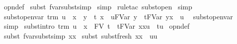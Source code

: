 \begin{isabellebody}
%
\isadelimproof
%
\endisadelimproof
%
\isatagproof
{}\isamarkupfalse%
\ opn{\isacharprime}{\isacharunderscore}def\isanewline
{}\isamarkupfalse%
\ {\isacharparenleft}subst{\isacharparenleft}{}{\isacharparenright}\ fvar{\isacharunderscore}subst{\isacharunderscore}simp{\isacharparenright}\isanewline
{}\isamarkupfalse%
\ simp\isanewline
{}\isamarkupfalse%
\ {\isacharparenleft}rule{\isacharunderscore}tac\ subst{\isacharunderscore}open{\isacharparenright}\isanewline
{}\isamarkupfalse%
\ simp%
\endisatagproof
{\isafoldproof}%
%
\isadelimproof
\isanewline
%
\endisadelimproof
\isanewline
{}\isamarkupfalse%
\ subst{\isacharunderscore}open{\isacharunderscore}var{}{\isacharcolon}\ {\isachardoublequoteopen}trm\ u\ {\isasymLongrightarrow}\ x\ {\isasymnoteq}\ y\ {\isasymLongrightarrow}\ {\isacharparenleft}t\ {\isacharbrackleft}x\ {\isacharcolon}{\isacharcolon}{\isacharequal}\ u{\isacharbrackright}{\isacharparenright}{\isacharcircum}FVar\ y\ {\isacharequal}\ {\isacharparenleft}t{\isacharcircum}FVar\ y{\isacharparenright}{\isacharbrackleft}x\ {\isacharcolon}{\isacharcolon}{\isacharequal}\ u{\isacharbrackright}{\isachardoublequoteclose}\ \isanewline
%
\isadelimproof
%
\endisadelimproof
%
\isatagproof
{}\isamarkupfalse%
\ subst{\isacharunderscore}open{\isacharunderscore}var\ \isamarkupfalse%
\ simp%
\endisatagproof
{\isafoldproof}%
%
\isadelimproof
\isanewline
%
\endisadelimproof
\isanewline
{}\isamarkupfalse%
\ subst{\isacharunderscore}intro{\isacharcolon}\ {\isachardoublequoteopen}trm\ u\ {\isasymLongrightarrow}\ x\ {\isasymnotin}\ FV\ t\ {\isasymLongrightarrow}\ {\isacharparenleft}t{\isacharcircum}FVar\ x{\isacharparenright}{\isacharbrackleft}x{\isacharcolon}{\isacharcolon}{\isacharequal}u{\isacharbrackright}\ {\isacharequal}\ t{\isacharcircum}u{\isachardoublequoteclose}\isanewline
%
\isadelimproof
%
\endisadelimproof
%
\isatagproof
{}\isamarkupfalse%
\ opn{\isacharprime}{\isacharunderscore}def\isanewline
{}\isamarkupfalse%
\ {\isacharparenleft}subst{\isacharparenleft}{}{\isacharparenright}\ fvar{\isacharunderscore}subst{\isacharunderscore}simp{}{\isacharbrackleft}\ x{\isacharequal}x{\isacharbrackright}{\isacharparenright}\isanewline
{}\isamarkupfalse%
\ {\isacharparenleft}subst{\isacharparenleft}{}{}{\isacharparenright}\ subst{\isacharunderscore}fresh{}{\isacharbrackleft}\ x{\isacharequal}x\ \ u{\isacharequal}u{\isacharbrackright}{\isacharparenright}\isanewline

\end{isabellebody}
